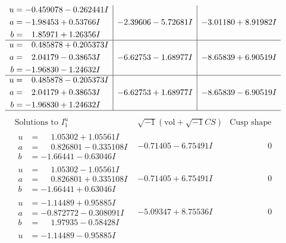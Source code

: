 \documentclass[1p]{elsarticle_modified}
\theoremstyle{definition}
\newcommand{\I}{\sqrt{-1}}
\begin{document}
$$\begin{array}{c|c|c}
\begin{aligned}
u &= -0.459078 - 0.262441 I \\
a &= -1.98453 + 0.53766 I \\
b &= \phantom{-}1.85971 + 1.26356 I\end{aligned}
 & -2.39606 - 5.72681 I & -3.01180 + 8.91982 I \\ \hline\begin{aligned}
u &= \phantom{-}0.485878 + 0.205373 I \\
a &= \phantom{-}2.04179 - 0.38653 I \\
b &= -1.96830 - 1.24632 I\end{aligned}
 & -6.62753 - 1.68977 I & -8.65839 + 6.90519 I \\ \hline\begin{aligned}
u &= \phantom{-}0.485878 - 0.205373 I \\
a &= \phantom{-}2.04179 + 0.38653 I \\
b &= -1.96830 + 1.24632 I\end{aligned}
 & -6.62753 + 1.68977 I & -8.65839 - 6.90519 I\\
 \hline 
 \end{array}$$\newpage$$\begin{array}{c|c|c}  
\text{Solutions to }I^u_{1}& \I (\text{vol} + \sqrt{-1}CS) & \text{Cusp shape}\\
 \hline 
\begin{aligned}
u &= \phantom{-}1.05302 + 1.05561 I \\
a &= \phantom{-}0.826801 - 0.335108 I \\
b &= -1.66441 - 0.63046 I\end{aligned}
 & -0.71405 - 6.75491 I & \phantom{-0.000000 } 0 \\ \hline\begin{aligned}
u &= \phantom{-}1.05302 - 1.05561 I \\
a &= \phantom{-}0.826801 + 0.335108 I \\
b &= -1.66441 + 0.63046 I\end{aligned}
 & -0.71405 + 6.75491 I & \phantom{-0.000000 } 0 \\ \hline\begin{aligned}
u &= -1.14489 + 0.95885 I \\
a &= -0.872772 - 0.308091 I \\
b &= \phantom{-}1.97935 - 0.58428 I\end{aligned}
 & -5.09347 + 8.75536 I & \phantom{-0.000000 } 0 \\ \hline\begin{aligned}
u &= -1.14489 - 0.95885 I \\

\end{aligned}
\end{array}$$
\end{document}
